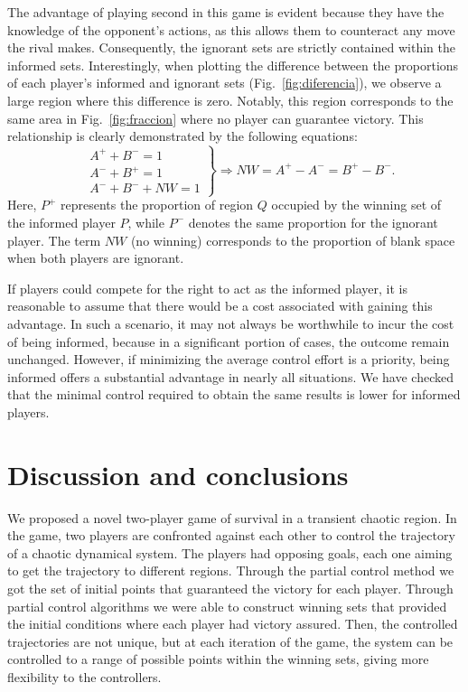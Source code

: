 The advantage of playing second in this game is evident because they have the knowledge of the opponent's actions, as this allows them to counteract any move the rival makes. Consequently, the ignorant sets are strictly contained within the informed sets. Interestingly, when plotting the difference between the proportions of each player's informed and ignorant sets (Fig.~\ref{fig:diferencia}), we observe a large region where this difference is zero. Notably, this region corresponds to the same area in Fig.~\ref{fig:fraccion} where no player can guarantee victory. This relationship is clearly demonstrated by the following equations:
\begin{equation}
   \left. \begin{array}{lll}
        &A^{+} + B^{-} = 1 \\
        &A^{-} + B^{+} = 1 \\
        &A^{-} + B^{-} + NW = 1
    \end{array}
    \right\} \Rightarrow NW = A^{+} - A^{-} = B^{+} - B^{-}.
\end{equation}
Here, $P^{+}$ represents the proportion of region $Q$ occupied by the winning set of the informed player $P$, while $P^{-}$ denotes the same proportion for the ignorant player. The term $NW$ (no winning) corresponds to the proportion of blank space when both players are ignorant.



If players could compete for the right to act as the informed player, it is reasonable to assume that there would be a cost associated with gaining this advantage. In such a scenario, it may not always be worthwhile to incur the cost of being informed, because in a significant portion of cases, the outcome remain unchanged. However, if minimizing the average control effort is a priority, being informed offers a substantial advantage in nearly all situations. We have checked that the minimal control required to obtain the same results is lower for informed players.



\section{Discussion and conclusions}

We proposed a novel two-player game of survival in a transient chaotic region. In the game, two players are confronted against each other to control the trajectory of a chaotic dynamical system. The players had opposing goals, each one aiming to get the trajectory to different regions. Through the partial control method we got the set of initial points that guaranteed the victory for each player. Through partial control algorithms we were able to construct winning sets that provided the initial conditions where each player had victory assured. Then, the controlled trajectories are not unique, but at each iteration of the game, the system can be controlled to a range of possible points within the winning sets, giving more flexibility to the controllers.

